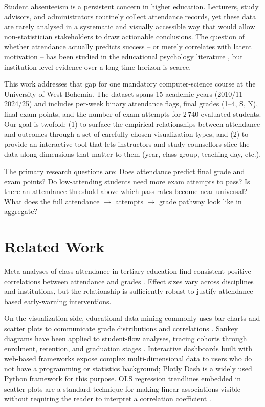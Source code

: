 \documentclass[final,3p,times,twocolumn]{elsarticle}
\begin{document}
Student absenteeism is a persistent concern in higher education.
Lecturers, study advisors, and administrators routinely collect
attendance records, yet these data are rarely analysed in a systematic
and visually accessible way that would allow non-statistician
stakeholders to draw actionable conclusions.
The question of whether attendance actually predicts success -- or merely
correlates with latent motivation -- has been studied in the educational
psychology literature \cite{Credé2010}, but institution-level evidence
over a long time horizon is scarce.

This work addresses that gap for one mandatory computer-science course at
the University of West Bohemia.
The dataset spans 15 academic years (2010/11 -- 2024/25) and includes
per-week binary attendance flags, final grades (1--4, S, N), final
exam points, and the number of exam attempts for 2\,740 evaluated
students.
Our goal is twofold: (1) to surface the empirical relationships between
attendance and outcomes through a set of carefully chosen visualization
types, and (2) to provide an interactive tool that lets instructors and
study counsellors slice the data along dimensions that matter to them
(year, class group, teaching day, etc.).

The primary research questions are: Does attendance predict final grade
and exam points? Do low-attending students need more exam attempts to
pass? Is there an attendance threshold above which pass rates become
near-universal? What does the full attendance $\to$ attempts $\to$ grade
pathway look like in aggregate?


\section{Related Work}
\label{sec:relatedwork}

Meta-analyses of class attendance in tertiary education find consistent
positive correlations between attendance and grades \cite{Credé2010}.
Effect sizes vary across disciplines and institutions, but the
relationship is sufficiently robust to justify attendance-based
early-warning interventions.

On the visualization side, educational data mining commonly uses
bar charts and scatter plots to communicate grade distributions and
correlations \cite{Romero2010}.
Sankey diagrams have been applied to student-flow analyses, tracing
cohorts through enrolment, retention, and graduation stages
\cite{Aulck2017}.
Interactive dashboards built with web-based frameworks expose complex
multi-dimensional data to users who do not have a programming or
statistics background; Plotly Dash \cite{Plotly2015} is a widely used
Python framework for this purpose.
OLS regression trendlines embedded in scatter plots are a standard
technique for making linear associations visible without requiring the
reader to interpret a correlation coefficient \cite{Cleveland1985}.
\end{document}
